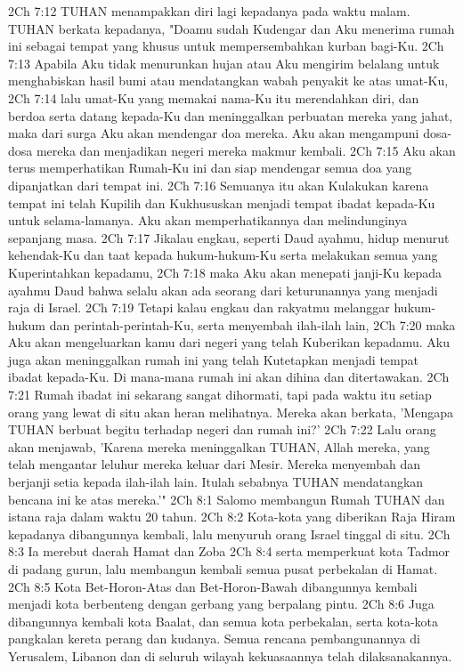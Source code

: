 2Ch 7:12  TUHAN menampakkan diri lagi kepadanya pada waktu malam. TUHAN berkata kepadanya, "Doamu sudah Kudengar dan Aku menerima rumah ini sebagai tempat yang khusus untuk mempersembahkan kurban bagi-Ku.
2Ch 7:13  Apabila Aku tidak menurunkan hujan atau Aku mengirim belalang untuk menghabiskan hasil bumi atau mendatangkan wabah penyakit ke atas umat-Ku,
2Ch 7:14  lalu umat-Ku yang memakai nama-Ku itu merendahkan diri, dan berdoa serta datang kepada-Ku dan meninggalkan perbuatan mereka yang jahat, maka dari surga Aku akan mendengar doa mereka. Aku akan mengampuni dosa-dosa mereka dan menjadikan negeri mereka makmur kembali.
2Ch 7:15  Aku akan terus memperhatikan Rumah-Ku ini dan siap mendengar semua doa yang dipanjatkan dari tempat ini.
2Ch 7:16  Semuanya itu akan Kulakukan karena tempat ini telah Kupilih dan Kukhususkan menjadi tempat ibadat kepada-Ku untuk selama-lamanya. Aku akan memperhatikannya dan melindunginya sepanjang masa.
2Ch 7:17  Jikalau engkau, seperti Daud ayahmu, hidup menurut kehendak-Ku dan taat kepada hukum-hukum-Ku serta melakukan semua yang Kuperintahkan kepadamu,
2Ch 7:18  maka Aku akan menepati janji-Ku kepada ayahmu Daud bahwa selalu akan ada seorang dari keturunannya yang menjadi raja di Israel.
2Ch 7:19  Tetapi kalau engkau dan rakyatmu melanggar hukum-hukum dan perintah-perintah-Ku, serta menyembah ilah-ilah lain,
2Ch 7:20  maka Aku akan mengeluarkan kamu dari negeri yang telah Kuberikan kepadamu. Aku juga akan meninggalkan rumah ini yang telah Kutetapkan menjadi tempat ibadat kepada-Ku. Di mana-mana rumah ini akan dihina dan ditertawakan.
2Ch 7:21  Rumah ibadat ini sekarang sangat dihormati, tapi pada waktu itu setiap orang yang lewat di situ akan heran melihatnya. Mereka akan berkata, 'Mengapa TUHAN berbuat begitu terhadap negeri dan rumah ini?'
2Ch 7:22  Lalu orang akan menjawab, 'Karena mereka meninggalkan TUHAN, Allah mereka, yang telah mengantar leluhur mereka keluar dari Mesir. Mereka menyembah dan berjanji setia kepada ilah-ilah lain. Itulah sebabnya TUHAN mendatangkan bencana ini ke atas mereka.'"
2Ch 8:1  Salomo membangun Rumah TUHAN dan istana raja dalam waktu 20 tahun.
2Ch 8:2  Kota-kota yang diberikan Raja Hiram kepadanya dibangunnya kembali, lalu menyuruh orang Israel tinggal di situ.
2Ch 8:3  Ia merebut daerah Hamat dan Zoba
2Ch 8:4  serta memperkuat kota Tadmor di padang gurun, lalu membangun kembali semua pusat perbekalan di Hamat.
2Ch 8:5  Kota Bet-Horon-Atas dan Bet-Horon-Bawah dibangunnya kembali menjadi kota berbenteng dengan gerbang yang berpalang pintu.
2Ch 8:6  Juga dibangunnya kembali kota Baalat, dan semua kota perbekalan, serta kota-kota pangkalan kereta perang dan kudanya. Semua rencana pembangunannya di Yerusalem, Libanon dan di seluruh wilayah kekuasaannya telah dilaksanakannya.
